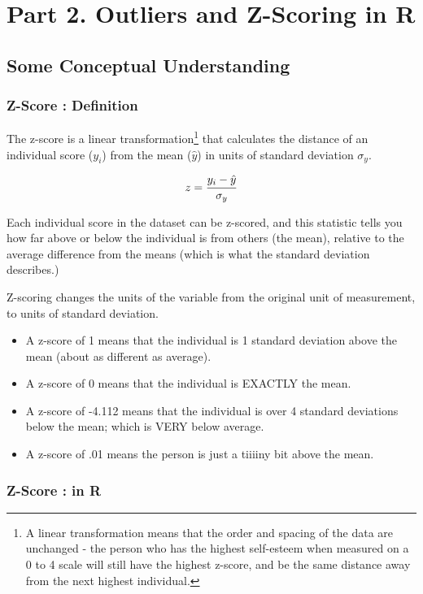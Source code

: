 \documentclass[
  letterpaper,
  DIV=11,
  numbers=noendperiod,
  oneside]{scrreprt}
\begin{document}
\chapter{Part 2. Outliers and Z-Scoring in
R}\label{part-2.-outliers-and-z-scoring-in-r}

\section{Some Conceptual
Understanding}\label{some-conceptual-understanding}

\subsection{Z-Score : Definition}\label{z-score-definition}

The z-score is a linear transformation\footnote{A linear transformation
  means that the order and spacing of the data are unchanged - the
  person who has the highest self-esteem when measured on a 0 to 4 scale
  will still have the highest z-score, and be the same distance away
  from the next highest individual.} that calculates the distance of an
individual score (\({y_i}\)) from the mean (\(\hat{y}\)) in units of
standard deviation \({\sigma_y}\).

\[
\huge z = \frac{y_i - \hat{y}}{\sigma_y}
\]

Each individual score in the dataset can be z-scored, and this statistic
tells you how far above or below the individual is from others (the
mean), relative to the average difference from the means (which is what
the standard deviation describes.)

Z-scoring changes the units of the variable from the original unit of
measurement, to units of standard deviation.

\begin{itemize}
\item
  A z-score of 1 means that the individual is 1 standard deviation above
  the mean (about as different as average).
\item
  A z-score of 0 means that the individual is EXACTLY the mean.
\item
  A z-score of -4.112 means that the individual is over 4 standard
  deviations below the mean; which is VERY below average.
\item
  A z-score of .01 means the person is just a tiiiiny bit above the
  mean.
\end{itemize}

\subsection{Z-Score : in R}\label{z-score-in-r}
\end{document}
